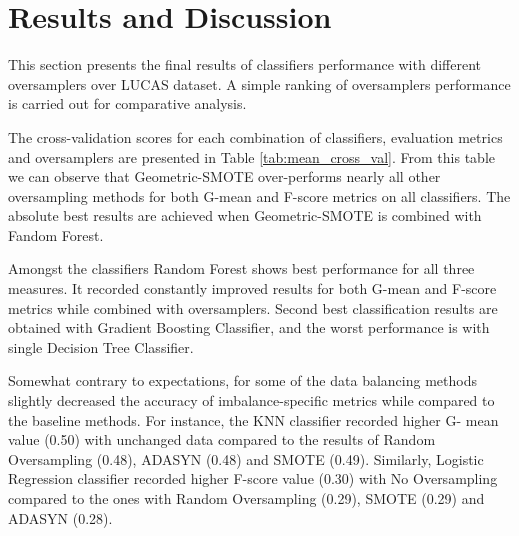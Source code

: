 \documentclass[parskip=full]{scrartcl}
\begin{document}
\section{Results and Discussion}

This section presents the final results of classifiers performance with
different oversamplers over LUCAS dataset. A simple ranking of oversamplers
performance is carried out for comparative analysis.

The cross-validation scores for each combination of classifiers, evaluation
metrics and oversamplers are presented in Table \ref{tab:mean_cross_val}. From
this table we can observe that Geometric-SMOTE over-performs nearly all other
oversampling methods for both G-mean and F-score metrics on all classifiers. The
absolute best results are achieved when Geometric-SMOTE is combined with Fandom
Forest.


Amongst the classifiers Random Forest shows best performance for all three
measures. It recorded constantly improved results for both G-mean and F-score
metrics while combined with oversamplers. Second best classification results are
obtained with Gradient Boosting Classifier, and the worst performance is with
single Decision Tree Classifier.

Somewhat contrary to expectations, for some of the data balancing methods
slightly decreased the accuracy of imbalance-specific metrics while compared to
the baseline methods. For instance, the KNN classifier recorded higher G- mean
value (0.50) with unchanged data compared to the results of Random Oversampling
(0.48), ADASYN (0.48) and SMOTE (0.49). Similarly, Logistic Regression
classifier recorded higher F-score value (0.30) with No Oversampling compared to
the ones with Random Oversampling (0.29), SMOTE (0.29) and ADASYN (0.28).
\end{document}
